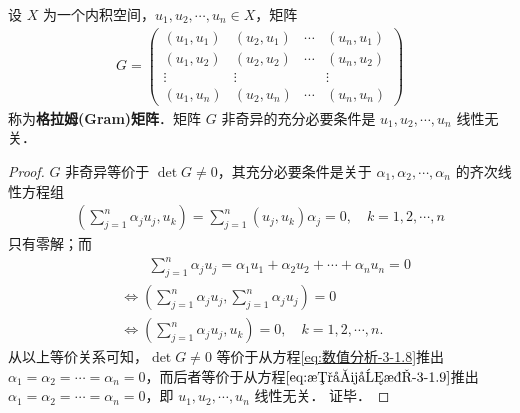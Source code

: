 \documentclass[../../main.tex]{subfiles}
\begin{document}
\begin{theorem}\label{theorem:数值分析-3-定理3}
设 \( X \) 为一个内积空间，\( u_1, u_2, \cdots, u_n \in X \)，矩阵
\begin{align}
G = \begin{pmatrix}
(u_1, u_1) & (u_2, u_1) & \cdots & (u_n, u_1) \\
(u_1, u_2) & (u_2, u_2) & \cdots & (u_n, u_2) \\
\vdots & \vdots & & \vdots \\
(u_1, u_n) & (u_2, u_n) & \cdots & (u_n, u_n)
\end{pmatrix} \label{eq:数值分析-3-1.7}
\end{align}
称为\textbf{格拉姆(Gram)矩阵}．矩阵 \( G\) 非奇异的充分必要条件是 \( u_1, u_2, \cdots, u_n \) 线性无关．
\end{theorem}
\begin{proof}
\(G \) 非奇异等价于 \( \det G \neq 0 \)，其充分必要条件是关于 \( \alpha_1, \alpha_2, \cdots, \alpha_n \) 的齐次线性方程组
\begin{align}
\left( \sum_{j=1}^n \alpha_j u_j, u_k \right) = \sum_{j=1}^n (u_j, u_k) \alpha_j = 0, \quad k = 1, 2, \cdots, n \label{eq:数值分析-3-1.8}
\end{align}
只有零解；而
\begin{align}
&\qquad \sum_{j=1}^n \alpha_j u_j = \alpha_1 u_1 + \alpha_2 u_2 + \cdots + \alpha_n u_n = 0 \label{eq:数值分析-3-1.9}\\
&\Leftrightarrow \left( \sum_{j=1}^n{\alpha _ju_j,\sum_{j=1}^n{\alpha _ju_j}} \right) =0 \nonumber
\\
&\Leftrightarrow \left( \sum_{j=1}^n{\alpha _ju_j,u_k} \right) =0,\quad k=1,2,\cdots ,n.\nonumber
\end{align}
从以上等价关系可知，\( \det G \neq 0 \) 等价于从方程\eqref{eq:数值分析-3-1.8}推出 \( \alpha_1 = \alpha_2 = \cdots = \alpha_n = 0 \)，而后者等价于从方程\(\eqref{eq:数值分析-3-1.9}\)推出 \( \alpha_1 = \alpha_2 = \cdots = \alpha_n = 0 \)，即 \( u_1, u_2, \cdots, u_n \) 线性无关．
证毕．

\end{proof}
\end{document}
